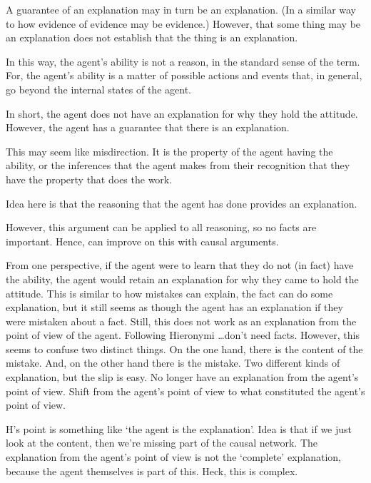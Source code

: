 \documentclass[10pt]{article}
\begin{document}
\begin{note}
 


  A guarantee of an explanation may in turn be an explanation.
  (In a similar way to how evidence of evidence may be evidence.)
  However, that some thing may be an explanation does not establish that the thing is an explanation.

  In this way, the agent's ability is not a reason, in the standard sense of the term.
  For, the agent's ability is a matter of possible actions and events that, in general, go beyond the internal states of the agent.

  In short, the agent does not have an explanation for why they hold the attitude.
  However, the agent has a guarantee that there is an explanation.

  This may seem like misdirection.
  It is the property of the agent having the ability, or the inferences that the agent makes from their recognition that they have the property that does the work.

  Idea here is that the reasoning that the agent has done provides an explanation.

  However, this argument can be applied to all reasoning, so no facts are important.
  Hence, can improve on this with causal arguments.

  From one perspective, if the agent were to learn that they do not (in fact) have the ability, the agent would retain an explanation for why they came to hold the attitude.
  This is similar to how mistakes can explain, the fact can do some explanation, but it still seems as though the agent has an explanation if they were mistaken about a fact.
  Still, this does not work as an explanation from the point of view of the agent.
  Following Hieronymi \dots don't need facts.
  However, this seems to confuse two distinct things.
  On the one hand, there is the content of the mistake.
  And, on the other hand there is the mistake.
  Two different kinds of explanation, but the slip is easy.
  No longer have an explanation from the agent's point of view.
  Shift from the agent's point of view to what constituted the agent's point of view.

  H's point is something like `the agent is the explanation'.
  {
    \color{red}
    Idea is that if we just look at the content, then we're missing part of the causal network.
    The explanation from the agent's point of view is not the `complete' explanation, because the agent themselves is part of this.
    Heck, this is complex.
  }


\end{note}
\end{document}
